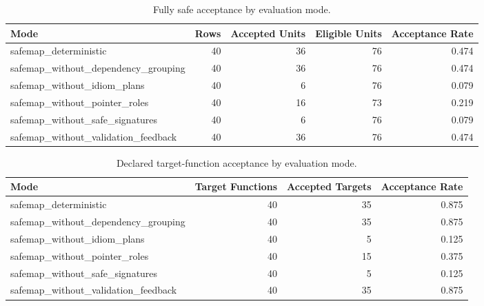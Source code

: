 \begin{table}[t]
\centering
\caption{Fully safe acceptance by evaluation mode.}
\label{tab:safemap-mode-summary}
\begin{tabular}{lrrrr}
\hline
Mode & Rows & Accepted Units & Eligible Units & Acceptance Rate \\
\hline
safemap\_deterministic & 40 & 36 & 76 & 0.474 \\
safemap\_without\_dependency\_grouping & 40 & 36 & 76 & 0.474 \\
safemap\_without\_idiom\_plans & 40 & 6 & 76 & 0.079 \\
safemap\_without\_pointer\_roles & 40 & 16 & 73 & 0.219 \\
safemap\_without\_safe\_signatures & 40 & 6 & 76 & 0.079 \\
safemap\_without\_validation\_feedback & 40 & 36 & 76 & 0.474 \\
\hline
\end{tabular}
\end{table}

\begin{table}[t]
\centering
\caption{Declared target-function acceptance by evaluation mode.}
\label{tab:safemap-target-summary}
\begin{tabular}{lrrr}
\hline
Mode & Target Functions & Accepted Targets & Acceptance Rate \\
\hline
safemap\_deterministic & 40 & 35 & 0.875 \\
safemap\_without\_dependency\_grouping & 40 & 35 & 0.875 \\
safemap\_without\_idiom\_plans & 40 & 5 & 0.125 \\
safemap\_without\_pointer\_roles & 40 & 15 & 0.375 \\
safemap\_without\_safe\_signatures & 40 & 5 & 0.125 \\
safemap\_without\_validation\_feedback & 40 & 35 & 0.875 \\
\hline
\end{tabular}
\end{table}


